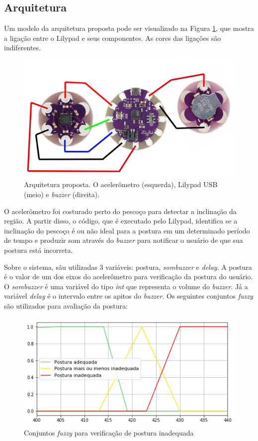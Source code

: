 \documentclass[12pt]{article}
\begin{document}
\subsection{Arquitetura}

Um modelo da arquitetura proposta pode ser visualizado na Figura \ref{fig:example3}, que mostra a ligação entre o Lilypad e seus componentes. As cores das ligações são indiferentes. 

\begin{figure}[ht]
\centering
\includegraphics[width=.4\textwidth]{diagrama_conexao.png}
\caption{Arquitetura proposta. O acelerômetro (esquerda), Lilypad USB (meio) e \textit{buzzer} (direita).}
\label{fig:example3}
\end{figure}

O acelerômetro foi costurado perto do pescoço para detectar a inclinação da região. A partir disso, o código, que é executado pelo Lilypad, identifica se a inclinação do pescoço é ou não ideal para a postura em um determinado período de tempo e produzir som através do \textit{buzzer} para notificar o usuário de que sua postura está incorreta.

Sobre o sistema, sãu utilizadas 3 variáveis: postura, \textit{sombuzzer} e \textit{delay}. A postura é o valor de um dos eixos do acelerômetro para verificação da postura do usuário. O \textit{sombuzzer} é uma variável do tipo \textit{int} que representa o volume do \textit{buzzer}. Já a variável \textit{delay} é o intervalo entre os apitos do \textit{buzzer}. Os seguintes conjuntos \textit{fuzzy} são utilizados para avaliação da postura:

\begin{figure}[ht]
    \centering
    \includegraphics[width=.7\textwidth]{download.png}
    \caption{Conjuntos \textit{fuzzy} para verificação de postura inadequada}
    \label{fig:fuzzy1}
\end{figure}
\end{document}
